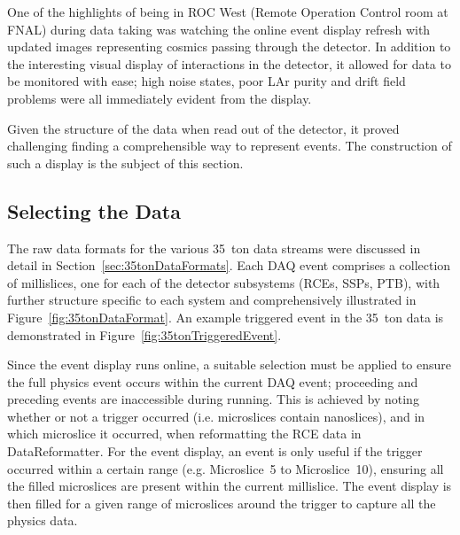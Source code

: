 One of the highlights of being in ROC West (Remote Operation Control room at FNAL) during data taking was watching the online event display refresh with updated images representing cosmics passing through the detector.  In addition to the interesting visual display of interactions in the detector, it allowed for data to be monitored with ease; high noise states, poor LAr purity and drift field problems were all immediately evident from the display.

Given the structure of the data when read out of the detector, it proved challenging finding a comprehensible way to represent events.  The construction of such a display is the subject of this section.

\subsection{Selecting the Data}\label{sec:SelectingEVDData}

The raw data formats for the various 35~ton data streams were discussed in detail in Section~\ref{sec:35tonDataFormats}.  Each DAQ event comprises a collection of millislices, one for each of the detector subsystems (RCEs, SSPs, PTB), with further structure specific to each system and comprehensively illustrated in Figure~\ref{fig:35tonDataFormat}.  An example triggered event in the 35~ton data is demonstrated in Figure~\ref{fig:35tonTriggeredEvent}.

Since the event display runs online, a suitable selection must be applied to ensure the full physics event occurs within the current DAQ event; proceeding and preceding events are inaccessible during running.  This is achieved by noting whether or not a trigger occurred (i.e. microslices contain nanoslices), and in which microslice it occurred, when reformatting the RCE data in DataReformatter.  For the event display, an event is only useful if the trigger occurred within a certain range (e.g. Microslice~5 to Microslice~10), ensuring all the filled microslices are present within the current millislice.  The event display is then filled for a given range of microslices around the trigger to capture all the physics data.

